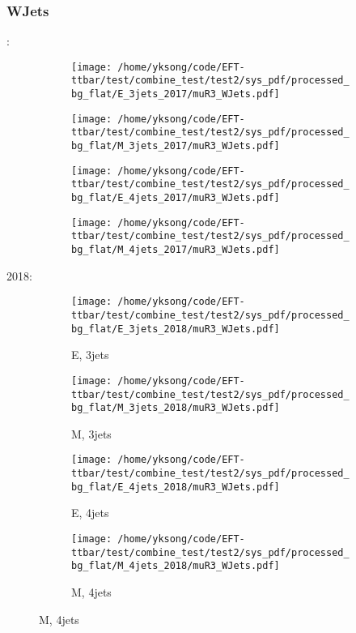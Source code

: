 \documentclass{beamer}
\begin{document}
\begin{frame}
\frametitle{WJets}
\fontsize{5}{1}:
\begin{figure}
\centering
\begin{subfigure}[b]{0.24\textwidth}
\texttt{[image: /home/yksong/code/EFT-ttbar/test/combine\_test/test2/sys\_pdf/processed\_bg\_flat/E\_3jets\_2017/muR3\_WJets.pdf]}
\end{subfigure}
\begin{subfigure}[b]{0.24\textwidth}
\texttt{[image: /home/yksong/code/EFT-ttbar/test/combine\_test/test2/sys\_pdf/processed\_bg\_flat/M\_3jets\_2017/muR3\_WJets.pdf]}
\end{subfigure}
\begin{subfigure}[b]{0.24\textwidth}
\texttt{[image: /home/yksong/code/EFT-ttbar/test/combine\_test/test2/sys\_pdf/processed\_bg\_flat/E\_4jets\_2017/muR3\_WJets.pdf]}
\end{subfigure}
\begin{subfigure}[b]{0.24\textwidth}
\texttt{[image: /home/yksong/code/EFT-ttbar/test/combine\_test/test2/sys\_pdf/processed\_bg\_flat/M\_4jets\_2017/muR3\_WJets.pdf]}
\end{subfigure}
\end{figure}
2018:
\begin{figure}
\centering
\begin{subfigure}[b]{0.24\textwidth}
\texttt{[image: /home/yksong/code/EFT-ttbar/test/combine\_test/test2/sys\_pdf/processed\_bg\_flat/E\_3jets\_2018/muR3\_WJets.pdf]}
\captionsetup{font=tiny}
\caption{E, 3jets}
\end{subfigure}
\begin{subfigure}[b]{0.24\textwidth}
\texttt{[image: /home/yksong/code/EFT-ttbar/test/combine\_test/test2/sys\_pdf/processed\_bg\_flat/M\_3jets\_2018/muR3\_WJets.pdf]}
\captionsetup{font=tiny}
\caption{M, 3jets}
\end{subfigure}
\begin{subfigure}[b]{0.24\textwidth}
\texttt{[image: /home/yksong/code/EFT-ttbar/test/combine\_test/test2/sys\_pdf/processed\_bg\_flat/E\_4jets\_2018/muR3\_WJets.pdf]}
\captionsetup{font=tiny}
\caption{E, 4jets}
\end{subfigure}
\begin{subfigure}[b]{0.24\textwidth}
\texttt{[image: /home/yksong/code/EFT-ttbar/test/combine\_test/test2/sys\_pdf/processed\_bg\_flat/M\_4jets\_2018/muR3\_WJets.pdf]}
\captionsetup{font=tiny}
\caption{M, 4jets}
\end{subfigure}
\end{figure}
\end{frame}
\end{document}
